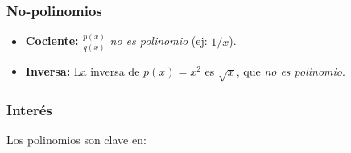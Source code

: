 \documentclass[12pt, a4paper]{article}
\theoremstyle{rioplatense}
\begin{document}
\subsubsection{No-polinomios}
\begin{itemize}
    \item \textbf{Cociente:} \( \displaystyle \frac{p(x)}{q(x)} \) \textit{no es polinomio} (ej: \( \displaystyle {1}/{x} \)).
    \item \textbf{Inversa:} La inversa de \( p(x) = x^2 \) es \( \sqrt{x} \), que \textit{no es polinomio}.
\end{itemize}

\subsubsection{Interés}
Los polinomios son clave en:
\end{document}
